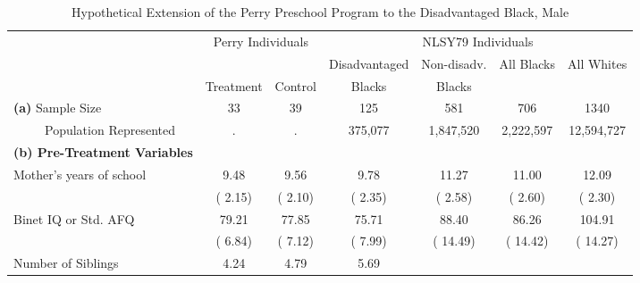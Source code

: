 \begin{table}[htbp]
\caption{\label{tab:tabmal_perry} Hypothetical Extension of the Perry Preschool Program to the Disadvantaged Black, Male}\medskip
\footnotesize  \begin{center} \begin{tabular}{lcccccccc}  \hline \hline    
&\multicolumn{2}{c}{Perry Individuals} &\multicolumn{6}{c}{NLSY79 Individuals}  \\[0.05cm]  \cline{2-3} \cline{5-9}   
 & \multicolumn{2}{c}{    }  & \multicolumn{2}{c}{Disadvantaged}  & \multicolumn{1}{c}{Non-disadv.}  & \multicolumn{2}{c}{All Blacks}  & \multicolumn{1}{c}{All Whites} \\  & \multicolumn{1}{c}{Treatment}  & \multicolumn{1}{c}{Control}  & \multicolumn{2}{c}{Blacks}  & \multicolumn{1}{c}{Blacks}  & \multicolumn{2}{c}{ } \\   \hline   
\textbf{(a)} Sample Size &33&           39& \multicolumn{2}{c}{          125} & \multicolumn{1}{c}{          581} &
\multicolumn{2}{c}{          706} &
\multicolumn{1}{c}{         1340} 
 \\[0.05cm] 
\ \ \ \ \ Population Represented &.&            .& \multicolumn{2}{c}{      375,077} & \multicolumn{1}{c}{    1,847,520} &
\multicolumn{2}{c}{    2,222,597} &
\multicolumn{1}{c}{   12,594,727} 
 \\[0.2cm] \hline
\textbf{(b) Pre-Treatment Variables}  \\[0.2cm] 
Mother's years of school &         9.48 &         9.56 & \multicolumn{2}{c}{         9.78} &
\multicolumn{1}{c}{        11.27} &
\multicolumn{2}{c}{        11.00} &
\multicolumn{1}{c}{        12.09} 
 \\[0.05cm]  
 & (        2.15) & (        2.10) & \multicolumn{2}{c}{(        2.35)} &
\multicolumn{1}{c}{(        2.58)} &
\multicolumn{2}{c}{(        2.60)} &
\multicolumn{1}{c}{(        2.30)} 
 \\[0.2cm]  
Binet IQ or Std. AFQ &        79.21 &        77.85 & \multicolumn{2}{c}{        75.71} &
\multicolumn{1}{c}{        88.40} &
\multicolumn{2}{c}{        86.26} &
\multicolumn{1}{c}{       104.91} 
 \\[0.05cm]  
 & (        6.84) & (        7.12) & \multicolumn{2}{c}{(        7.99)} &
\multicolumn{1}{c}{(       14.49)} &
\multicolumn{2}{c}{(       14.42)} &
\multicolumn{1}{c}{(       14.27)} 
 \\[0.2cm]  
Number of Siblings &         4.24 &         4.79 & \multicolumn{2}{c}{         5.69} &

\end{tabular}
\end{center}
\end{table}
